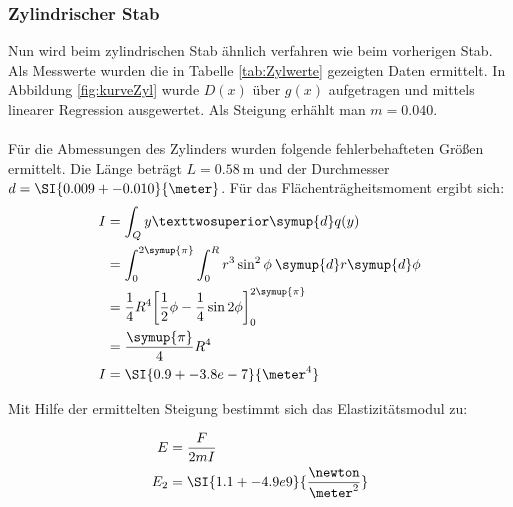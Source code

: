 \subsubsection{Zylindrischer Stab}
Nun wird beim zylindrischen Stab ähnlich verfahren wie beim vorherigen Stab.
Als Messwerte wurden die in Tabelle \ref{tab:Zylwerte} gezeigten Daten ermittelt.
In Abbildung \ref{fig:kurveZyl} wurde $D(x)$ über $g(x)$ aufgetragen und mittels linearer Regression ausgewertet. Als Steigung erhählt man $m=\num{0.040}$.
\\
\\
Für die Abmessungen des Zylinders wurden folgende fehlerbehafteten Größen ermittelt.
Die Länge beträgt $L=\SI{0.58}{\meter}$ und der Durchmesser $d=\SI{0.009+-0.010}{\meter}$.
Für das Flächenträgheitsmoment ergibt sich:
\begin{align*}
    I &= \int_Q y² \symup{d}q(y) \\
      &= \int_0^{2\symup{\pi}} \int_0^R r^3\sin^2\phi \: \symup{d}r\symup{d}\phi \\
      &= \frac{1}{4}R^4 \biggl[\frac{1}{2}\phi-\frac{1}{4}\sin2\phi\biggr]_0^{2\symup{\pi}} \\
      &= \frac{\symup{\pi}}{4}R^4 \\
    I &= \SI{0.9+-3.8e-7}{\meter^4} \\
\end{align*}

Mit Hilfe der ermittelten Steigung bestimmt sich das Elastizitätsmodul zu:

\begin{align*}
    E   &= \frac{F}{2mI} \\
    E_2 &= \SI{1.1+-4.9e9}{\frac{\newton}{\meter^2}} \\
\end{align*}

